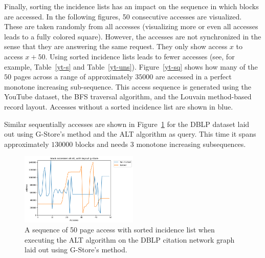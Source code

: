     
    Finally, sorting the incidence lists has an impact on the sequence in which blocks are accessed. 
    In the following figures, 50 consecutive accesses are visualized. These are taken randomly from all accesses (visualizing more or even all accesses leads to a fully colored square). However, the accesses are not synchronized in the sense that they are answering the same request. They only show access $x$ to access $x + 50$. Using sorted incidence lists leads to fewer accesses (see, for example, Table~\ref{yt-s} and Table~\ref{yt-uns}).
    Figure~\ref{yt-sq} shows how many of the $50$ pages across a range of approximately $35000$ are accessed in a perfect monotone increasing sub-sequence. This access sequence is generated using the YouTube dataset, the BFS traversal algorithm, and the Louvain method-based record layout. Accesses without a sorted incidence list are shown in blue.

    Similar sequentially accesses are shown in Figure~\ref{dblp_good} for the DBLP dataset laid out using G-Store's method and the ALT algorithm as query. This time it spans approximately $130000$ blocks and needs 3 monotone increasing subsequences.
    \begin{figure}[htp]
        \begin{center}
            \includegraphics[keepaspectratio,width=0.5\textwidth]{img/07-eval/dblp_g-store_alt_block_sil_access_seq.png}
        \end{center}
        \caption{A sequence of 50 page access with sorted incidence list when executing the ALT algorithm on the DBLP citation network graph laid out using G-Store's method.} 
        \label{dblp_good}
    \end{figure}
    
